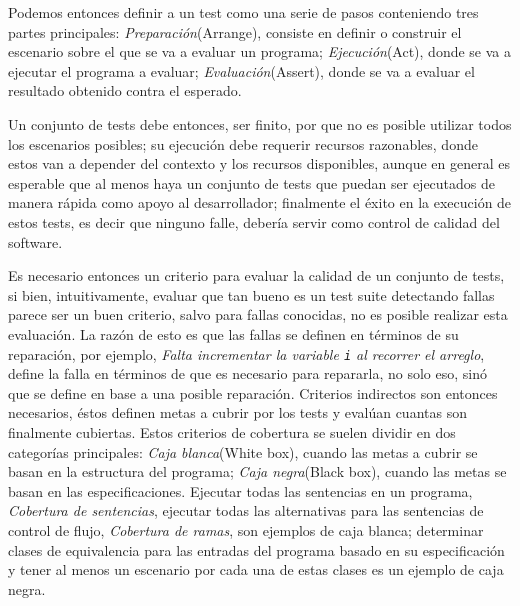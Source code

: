 Podemos entonces definir a un test como una serie de pasos conteniendo tres partes principales: \emph{Preparaci\'on}(Arrange), consiste en definir o construir el escenario sobre el que se va a evaluar un programa; \emph{Ejecuci\'on}(Act), donde se va a ejecutar el programa a evaluar; \emph{Evaluaci\'on}(Assert), donde se va a evaluar el resultado obtenido contra el esperado.

Un conjunto de tests debe entonces, ser finito, por que no es posible utilizar todos los escenarios posibles; su ejecuci\'on debe requerir recursos razonables, donde estos van a depender del contexto y los recursos disponibles, aunque en general es esperable que al menos haya un conjunto de tests que puedan ser ejecutados de manera r\'apida como apoyo al desarrollador; finalmente el \'exito en la execuci\'on de estos tests, es decir que ninguno falle, deber\'ia servir como control de calidad del software.

Es necesario entonces un criterio para evaluar la calidad de un conjunto de tests, si bien, intuitivamente, evaluar que tan bueno es un test suite detectando fallas parece ser un buen criterio, salvo para fallas conocidas, no es posible realizar esta evaluaci\'on. La raz\'on de esto es que las fallas se definen en t\'erminos de su reparaci\'on, por ejemplo, \emph{Falta incrementar la variable \texttt{i} al recorrer el arreglo}, define la falla en t\'erminos de que es necesario para repararla, no solo eso, sin\'o que se define en base a una posible reparaci\'on. Criterios indirectos son entonces necesarios, \'estos definen metas a cubrir por los tests y eval\'uan cuantas son finalmente cubiertas. Estos criterios de cobertura se suelen dividir en dos categor\'ias principales: \emph{Caja blanca}(White box), cuando las metas a cubrir se basan en la estructura del programa; \emph{Caja negra}(Black box), cuando las metas se basan en las especificaciones. Ejecutar todas las sentencias en un programa, \emph{Cobertura de sentencias}, ejecutar todas las alternativas para las sentencias de control de flujo, \emph{Cobertura de ramas}, son ejemplos de caja blanca; determinar clases de equivalencia para las entradas del programa basado en su especificaci\'on y tener al menos un escenario por cada una de estas clases es un ejemplo de caja negra.

